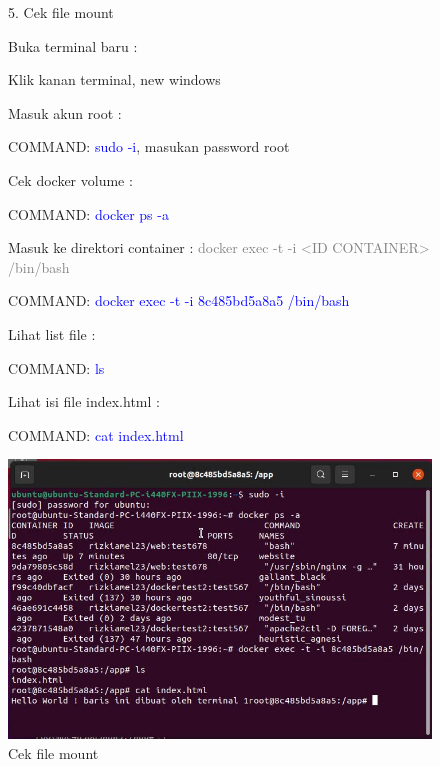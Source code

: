 \begin{figure}
    5. Cek file mount
    
    Buka terminal baru :
    
    Klik kanan terminal, new windows 
    
    Masuk akun root :
    
    COMMAND: \textcolor{Blue}{sudo -i}, masukan password root
    
    Cek docker volume :
    
    COMMAND: \textcolor{Blue}{docker ps -a}
    
    Masuk ke direktori container : \textcolor{Gray}{docker exec -t -i <ID CONTAINER> /bin/bash}
    
    COMMAND: \textcolor{Blue}{docker exec -t -i 8c485bd5a8a5 /bin/bash}
    
    Lihat list file :
    
    COMMAND: \textcolor{Blue}{ls}
    
    Lihat isi file index.html :
    
    COMMAND: \textcolor{Blue}{cat index.html}
        \begin{center}
            \includegraphics[width=\linewidth]{image/65.jpg}
            \caption{Cek file mount}
            \label{fig:my_figure}
        \end{center}
\end{figure}

